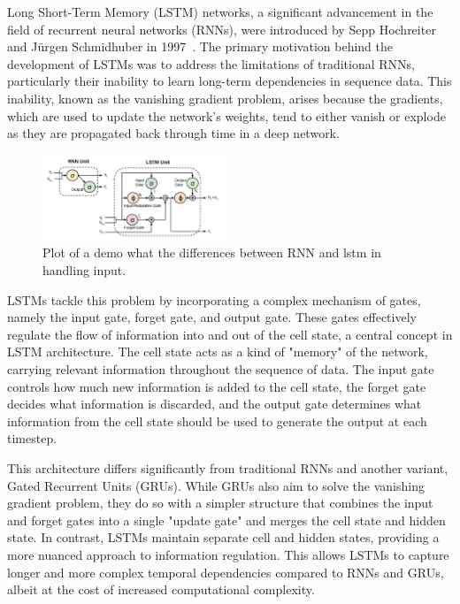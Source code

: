 \documentclass[10pt,twocolumn,letterpaper]{article}
\begin{document}
Long Short-Term Memory (LSTM) networks, a significant advancement in the field of recurrent neural networks (RNNs), were introduced by Sepp Hochreiter and Jürgen Schmidhuber in 1997~\cite{FuzzyInferenceLSTM}. The primary motivation behind the development of LSTMs was to address the limitations of traditional RNNs, particularly their inability to learn long-term dependencies in sequence data. This inability, known as the vanishing gradient problem, arises because the gradients, which are used to update the network's weights, tend to either vanish or explode as they are propagated back through time in a deep network.

\begin{figure}[htbp]
   \centering
   \includegraphics[width=0.49\textwidth]{Fig/3.png}
   \caption{Plot of a demo what the differences between RNN and lstm in handling input.} \label{fig3}
\end{figure}


LSTMs tackle this problem by incorporating a complex mechanism of gates, namely the input gate, forget gate, and output gate. These gates effectively regulate the flow of information into and out of the cell state, a central concept in LSTM architecture. The cell state acts as a kind of "memory" of the network, carrying relevant information throughout the sequence of data. The input gate controls how much new information is added to the cell state, the forget gate decides what information is discarded, and the output gate determines what information from the cell state should be used to generate the output at each timestep.

This architecture differs significantly from traditional RNNs and another variant, Gated Recurrent Units (GRUs). While GRUs also aim to solve the vanishing gradient problem, they do so with a simpler structure that combines the input and forget gates into a single "update gate" and merges the cell state and hidden state. In contrast, LSTMs maintain separate cell and hidden states, providing a more nuanced approach to information regulation. This allows LSTMs to capture longer and more complex temporal dependencies compared to RNNs and GRUs, albeit at the cost of increased computational complexity.
\end{document}
